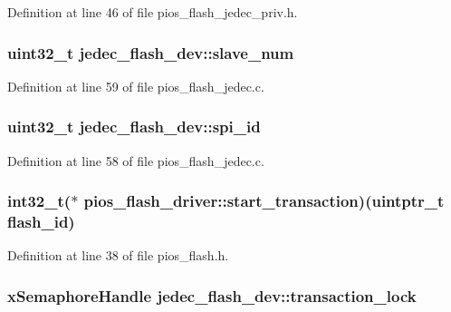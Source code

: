\-Definition at line 46 of file pios\-\_\-flash\-\_\-jedec\-\_\-priv.\-h.

\hypertarget{group___p_i_o_s___f_l_a_s_h_ga38ca35aafe78e6032326184768221fab}{
\subsubsection[{slave\-\_\-num}]{\setlength{\rightskip}{0pt plus 5cm}uint32\-\_\-t {\bf jedec\-\_\-flash\-\_\-dev\-::slave\-\_\-num}}}\label{group___p_i_o_s___f_l_a_s_h_ga38ca35aafe78e6032326184768221fab}


\-Definition at line 59 of file pios\-\_\-flash\-\_\-jedec.\-c.

\hypertarget{group___p_i_o_s___f_l_a_s_h_ga0f87de9cf831cf45ad2e81d4629cf021}{
\subsubsection[{spi\-\_\-id}]{\setlength{\rightskip}{0pt plus 5cm}uint32\-\_\-t {\bf jedec\-\_\-flash\-\_\-dev\-::spi\-\_\-id}}}\label{group___p_i_o_s___f_l_a_s_h_ga0f87de9cf831cf45ad2e81d4629cf021}


\-Definition at line 58 of file pios\-\_\-flash\-\_\-jedec.\-c.

\hypertarget{group___p_i_o_s___f_l_a_s_h_ga3128721bfc5d4b157f9c8866d10d80f0}{
\subsubsection[{start\-\_\-transaction}]{\setlength{\rightskip}{0pt plus 5cm}int32\-\_\-t($\ast$ {\bf pios\-\_\-flash\-\_\-driver\-::start\-\_\-transaction})(uintptr\-\_\-t flash\-\_\-id)}}\label{group___p_i_o_s___f_l_a_s_h_ga3128721bfc5d4b157f9c8866d10d80f0}


\-Definition at line 38 of file pios\-\_\-flash.\-h.

\hypertarget{group___p_i_o_s___f_l_a_s_h_ga28870637f7372faa2a3fb2bd887a4ab7}{
\subsubsection[{transaction\-\_\-lock}]{\setlength{\rightskip}{0pt plus 5cm}x\-Semaphore\-Handle {\bf jedec\-\_\-flash\-\_\-dev\-::transaction\-\_\-lock}}}\label{group___p_i_o_s___f_l_a_s_h_ga28870637f7372faa2a3fb2bd887a4ab7}


